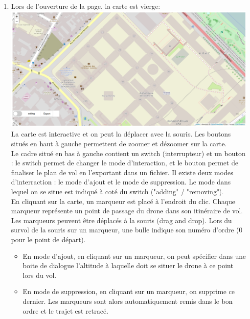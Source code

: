 \documentclass{article}
\begin{document}
 \begin{enumerate}
 \item Lors de l'ouverture de la page, la carte est vierge:\\
 \includegraphics[scale=0.42]{capt1.PNG}\\
 La carte est interactive et on peut la déplacer avec la souris.
  Les boutons situés en haut à gauche permettent de zoomer et dézoomer sur la carte.\\
 Le cadre situé en bas à gauche contient un switch (interrupteur) et un bouton : le switch permet de changer le mode d'interaction, et le bouton permet de finaliser le plan de vol en l'exportant dans un fichier.
 Il existe deux modes d'interraction :  le mode d'ajout et le mode de suppression. Le mode dans lequel on se situe est indiqué à coté du switch ("adding" / "removing").\\
  En cliquant sur la carte, un marqueur est placé à l'endroit du clic. Chaque marqueur représente un point de passage du drone dans son itinéraire de vol. Les marqueurs peuvent être déplacés à la souris (drag and drop). Lors du survol de la souris sur un marqueur, une bulle indique son numéro d'ordre (0 pour le point de départ).
  \begin{itemize}
 \item En mode d'ajout, en cliquant sur un marqueur, on peut spécifier dans une boite de dialogue l'altitude à laquelle doit se situer le drone à ce point lors du vol.
 \item En mode de suppression, en cliquant sur un marqueur, on supprime ce dernier. Les marqueurs sont alors automatiquement remis dans le bon ordre et le trajet est retracé.
 \end{itemize}
    \medbreak
   

\end{enumerate}
\end{document}
